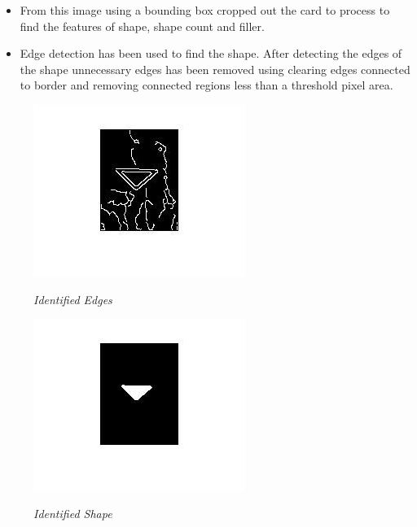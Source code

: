\begin{itemize}
	\item From this image using a bounding box cropped out the card to process to find the features of shape, shape count and filler.
\end{itemize}

\begin{itemize}
	\item Edge detection has been used to find the shape. After detecting the edges of the shape unnecessary edges has been removed using clearing edges connected to border and removing connected regions less than a threshold pixel area.
	
\end{itemize}
\begin{figure}[position = here]
	\begin{centering}
		\includegraphics[scale=0.8]{./sachiths_images/image10.jpg}\\
		\caption[]{\textit{Identified Edges}}
	\end{centering}
\end{figure}
\begin{figure}[position = here]
	\begin{centering}
		\includegraphics[scale=0.8]{./sachiths_images/image11.jpg}\\
		\caption[]{\textit{Identified Shape}}
	\end{centering}
\end{figure}
